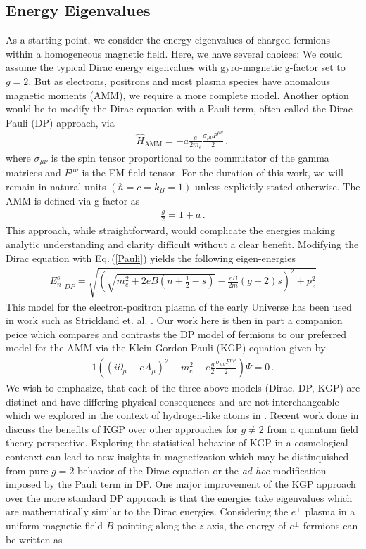 \documentclass[universe,article,submit,moreauthors,pdftex,a4paper]{Definitions/mdpi}
\newcommand{\req}[1]{Eq.\,(\ref{#1})}
\begin{document}
\subsection{Energy Eigenvalues}\label{sec:energy}
\noindent As a starting point, we consider the energy eigenvalues of charged fermions within a homogeneous magnetic field. Here, we have several choices: We could assume the typical Dirac energy eigenvalues with gyro-magnetic g-factor set to $g=2$. But as electrons, positrons and most plasma species have anomalous magnetic moments (AMM), we require a more complete model. Another option would be to modify the Dirac equation with a Pauli term, often called the Dirac-Pauli (DP) approach, via
\begin{align}
  \label{Pauli} \hat{H}_{\mathrm{AMM}} = -a\frac{e}{2m_{e}}\frac{\sigma_{\mu\nu}F^{\mu\nu}}{2}\,,
\end{align}
where $\sigma_{\mu\nu}$ is the spin tensor proportional to the commutator of the gamma matrices and $F^{\mu\nu}$ is the EM field tensor. For the duration of this work, we will remain in natural units $(\hbar=c=k_{B}=1)$ unless explicitly stated otherwise. The AMM is defined via g-factor as
\begin{align}
  \label{AMM} \frac{g}{2}=1+a\,.
\end{align}
This approach, while straightforward, would complicate the energies making analytic understanding and clarity difficult without a clear benefit. Modifying the Dirac equation with \req{Pauli} yields the following eigen-energies
\begin{align}
  \label{DPEnergy} E_{n}^{s}\vert_{DP}=\sqrt{\left(\sqrt{m_{e}^{2}+2eB\left(n+\frac{1}{2}-s\right)}-\frac{eB}{2m}(g-2)s\right)^{2}+p_{z}^{2}}
\end{align}
This model for the electron-positron plasma of the early Universe has been used in work such as Strickland et. al. \cite{Strickland:2012vu}. Our work here is then in part a companion peice which compares and contrasts the DP model of fermions to our preferred model for the AMM via the Klein-Gordon-Pauli (KGP) equation given by
\begin{alignat}{1}
  \label{KGP} \left(\left(i\partial_{\mu}-eA_{\mu}\right)^{2}-m_{e}^{2}-e\frac{g}{2}\frac{\sigma_{\mu\nu}F^{\mu\mu}}{2}\right)\Psi=0\,.
\end{alignat}
We wish to emphasize, that each of the three above models (Dirac, DP, KGP) are distinct and have differing physical consequences and are not interchangeable which we explored in the context of hydrogen-like atoms in \cite{Steinmetz:2018ryf}. Recent work done in \cite{Rafelski:2022bsv} discuss the benefits of KGP over other approaches for $g\neq2$ from a quantum field theory perspective. Exploring the statistical behavior of KGP in a cosmological contenxt can lead to new insights in magnetization which may be distinquished from pure $g=2$ behavior of the Dirac equation or the \emph{ad hoc} modification imposed by the Pauli term in DP. One major improvement of the KGP approach over the more standard DP approach is that the energies take eigenvalues which are mathematically similar to the Dirac energies. Considering the $e^\pm$ plasma in a uniform magnetic field $B$ pointing along the $z$-axis, the energy of $e^\pm$ fermions can be written as
\end{document}
